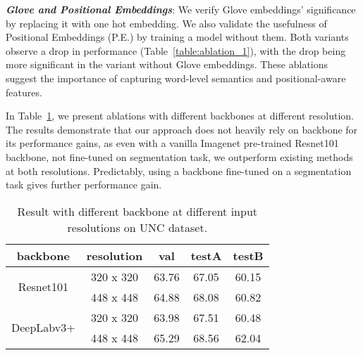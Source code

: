 \documentclass[11pt]{article}
\begin{document}
\emph{\textbf{Glove and Positional Embeddings}}: We verify Glove embeddings' significance by replacing it with one hot embedding. We also validate the usefulness of Positional Embeddings (P.E.) by training a model without them. Both variants observe a drop in performance (Table~\ref{table:ablation_1}), with the drop being more significant in the variant without Glove embeddings. These ablations suggest the importance of capturing word-level semantics and positional-aware features.







In Table~\ref{table:resolution_backbone}, we present ablations with different backbones at different resolution.
The results demonstrate that our approach does not heavily rely on backbone for its performance gains, as even with a vanilla Imagenet pre-trained Resnet101 backbone, not fine-tuned on segmentation task, we outperform existing methods at both resolutions. Predictably, using a backbone fine-tuned on a segmentation task gives further performance gain.






\begin{table}[h]
\small
\begin{center}
\begin{tabular}{|c|c|c|c|c|}
\hline
backbone                         & resolution & val   & testA & testB \\ \hline
\multirow{2}{*}{Resnet101}       & 320 x 320  & 63.76 & 67.05 & 60.15 \\ \cline{2-5} 
                                 & 448 x 448  & 64.88 & 68.08 & 60.82 \\ \hline
\multirow{2}{*}{DeepLabv3+}      & 320 x 320  & 63.98 & 67.51 & 60.48 \\ \cline{2-5} 
                                 & 448 x 448  & 65.29 & 68.56 & 62.04 \\ \hline
\end{tabular}
\end{center}
\caption{Result with different backbone at different input resolutions on UNC dataset.}
\label{table:resolution_backbone}
\end{table}
\end{document}
